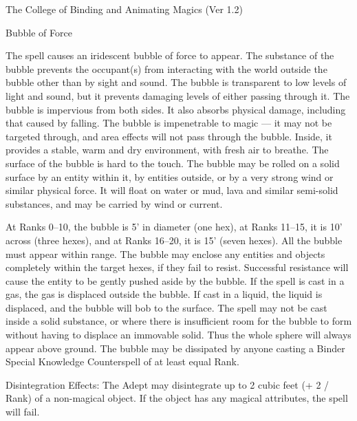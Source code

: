 \begin{Chapter}{The College of Binding and Animating Magics (Ver 1.2)}
\begin{spell}[S-1]{Bubble of Force}
\begin{effects}
The spell causes an iridescent bubble of force to appear.  The
substance of the bubble prevents the occupant(s) from interacting with
the world outside the bubble other than by sight and sound.  The
bubble is transparent to low levels of light and sound, but it
prevents damaging levels of either passing through it. The bubble is
impervious from both sides.  It also absorbs physical damage,
including that caused by falling.  The bubble is impenetrable to magic
— it may not be targeted through, and area effects will not pass
through the bubble.  Inside, it provides a stable, warm and dry
environment, with fresh air to breathe. The surface of the bubble is
hard to the touch. The bubble may be rolled on a solid surface by an
entity within it, by entities outside, or by a very strong wind or
similar physical force.  It will float on water or mud, lava and
similar semi-solid substances, and may be carried by wind or
current.

At Ranks 0--10, the bubble is 5’ in diameter (one hex), at Ranks
11--15, it is 10’ across (three hexes), and at Ranks 16--20, it is 15’
(seven hexes).  All the bubble must appear within range.  The bubble
may enclose any entities and objects completely within the target
hexes, if they fail to resist.  Successful resistance will cause the
entity to be gently pushed aside by the bubble.  If the spell is cast
in a gas, the gas is displaced outside the bubble.  If cast in a
liquid, the liquid is displaced, and the bubble will bob to the
surface.  The spell may not be cast inside a solid substance, or where
there is insufficient room for the bubble to form without having to
displace an immovable solid.  Thus the whole sphere will always appear
above ground.  The bubble may be dissipated by anyone casting a Binder
Special Knowledge Counterspell of at least equal Rank.
\end{effects}
\end{spell}

\begin{spell}[S-2]{Disintegration }
Effects:  The  Adept  may  disintegrate  up to  2  cubic 
feet  (+  2  /  Rank)  of  a  non-magical  object.  If  the 
object has any magical attributes, the spell will fail. 
\end{spell}


\end{Chapter}
